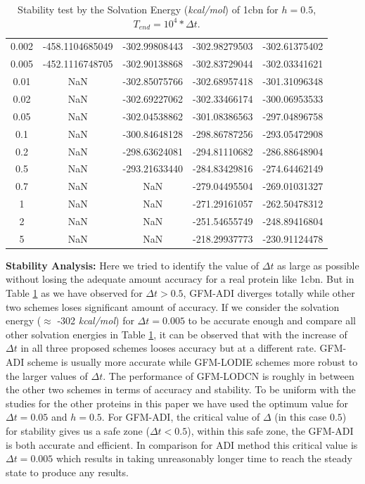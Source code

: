 \begin{table}[!ht]
\begin{tabular}{c c c c c }
0.002 & -458.1104685049 & -302.99808443  & -302.98279503   & -302.61375402 \\
0.005 & -452.1116748705 & -302.90138868  & -302.83729044   & -302.03341621   \\
0.01  &    NaN         & -302.85075766   & -302.68957418   & -301.31096348   \\
0.02  &    NaN         & -302.69227062   & -302.33466174   & -300.06953533   \\
0.05  &    NaN          & -302.04538862   & -301.08386563   & -297.04896758   \\
0.1   &    NaN          & -300.84648128   & -298.86787256   & -293.05472908   \\
0.2   &    NaN           & -298.63624081   & -294.81110682   & -286.88648904   \\
0.5   &    NaN          & -293.21633440   & -284.83429816   & -274.64462149   \\
0.7   &   NaN           & NaN             & -279.04495504   & -269.01031327   \\
1     &     NaN         & NaN             & -271.29161057   & -262.50478312   \\
2     &    NaN          & NaN             & -251.54655749   & -248.89416804   \\
5     &    NaN           & NaN             & -218.29937773   & -230.91124478 \\ \hline
\end{tabular}
\caption{Stability test by the Solvation Energy ({\it kcal/mol}) of 1cbn for $h=0.5$, $T_{end} = 10^4*\Delta t$.}
\label{tab-1cbn}
\end{table}

{\bf Stability Analysis: }Here we tried to identify the value of $\Delta t$ as large as possible without losing the adequate amount accuracy for a real protein like 1cbn. But in Table \ref{tab-1cbn} as we have observed  for $\Delta t > 0.5$, GFM-ADI diverges totally while other two schemes loses significant amount of accuracy. If we consider the solvation energy ($\approx $ -302 {\it kcal/mol}) for $\Delta t =0.005$ to be accurate enough and compare all other solvation energies in Table \ref{tab-1cbn}, it can be observed that with the increase of $\Delta t$ in all three proposed schemes looses accuracy but at a different rate. GFM-ADI scheme is usually more accurate while GFM-LODIE schemes more robust to the larger values of $\Delta t$. The performance of GFM-LODCN is roughly in between the other two schemes in terms of accuracy and stability. To be uniform  with the studies for the other proteins in this paper we have used the optimum value for $\Delta t =0.05$ and $h=0.5$. For GFM-ADI, the critical value of $\Delta$ (in this case $0.5$) for stability gives us a safe zone ($\Delta t < 0.5$), within this safe zone, the GFM-ADI is both accurate and efficient. In comparison for ADI method this critical value is $\Delta t = 0.005$ which results in taking unreasonably longer time to reach the steady state to produce any results. 


